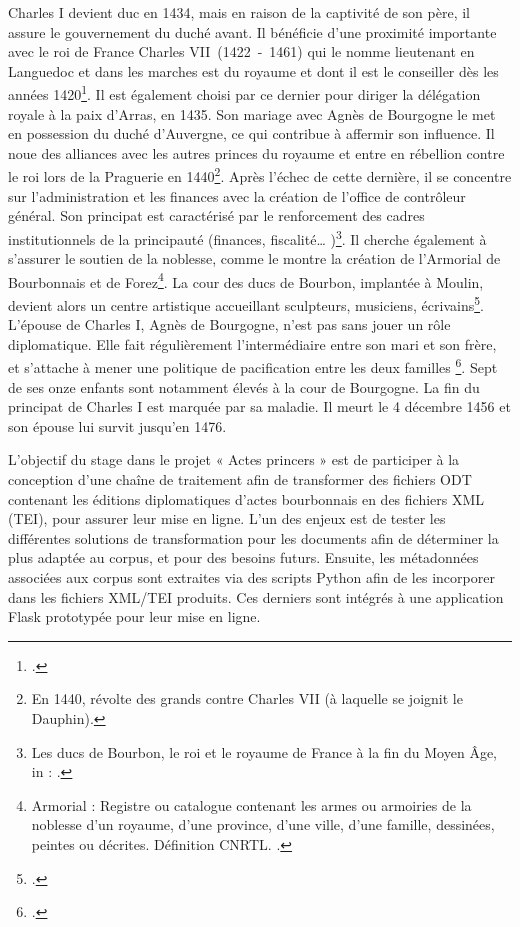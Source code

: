 \par Charles I devient duc en 1434, mais en raison de la captivité de son père, il assure le gouvernement du duché avant. Il bénéficie d'une proximité importante avec le roi de France Charles VII~(1422~-~1461) qui le nomme lieutenant en Languedoc et dans les marches est du royaume et dont il est le conseiller dès les années 1420\footnote{\cite{leguaiSeigneurieEtatBourbonnais1975a}.}. Il est également choisi par ce dernier pour diriger la délégation royale à la paix d’Arras, en 1435. Son mariage avec Agnès de Bourgogne le met en possession du duché d'Auvergne, ce qui contribue à affermir son influence. Il noue des alliances avec les autres princes du royaume et entre en rébellion contre le roi lors de la Praguerie en 1440\footnote{En 1440, révolte des grands contre Charles VII (à laquelle se joignit le Dauphin).}. Après l'échec de cette dernière, il se concentre sur l'administration et les finances avec la création de l'office de contrôleur général. Son principat est caractérisé par le renforcement des cadres institutionnels de la principauté (finances, fiscalité… )\footnote{\og Les ducs de Bourbon, le roi et le royaume de France à la fin du Moyen Âge\fg, in : \cite{matteoniBourbonsLeurBibliotheque2022}.}. Il cherche également à s'assurer le soutien de la noblesse, comme le montre la création de l'Armorial de Bourbonnais et de Forez\footnote{Armorial : Registre ou catalogue contenant les armes ou armoiries de la noblesse d'un royaume, d'une province, d'une ville, d'une famille, dessinées, peintes ou décrites. Définition CNRTL. \cite{deboosArmorialAuvergne1998}.}. La cour des ducs de Bourbon, implantée à Moulin, devient alors un centre artistique accueillant sculpteurs, musiciens, écrivains\footnote{\cite{leguaiSeigneurieEtatBourbonnais1975a}.}. L'épouse de Charles I, Agnès de Bourgogne, n'est pas sans jouer un rôle diplomatique. Elle fait régulièrement l'intermédiaire entre son mari et son frère, et s'attache à mener une politique de pacification entre les deux familles \footnote{\cite{leguaiAgnesBourgogneDuchesse1996}.}. Sept de ses onze enfants sont notamment élevés à la cour de Bourgogne. La fin du principat de Charles I est marquée par sa maladie. Il meurt le 4 décembre 1456 et son épouse lui survit jusqu'en 1476.
\newpage 

\par L'objectif du stage dans le projet « Actes princers » est de participer à la conception d'une chaîne de traitement afin de transformer des fichiers ODT contenant les éditions diplomatiques d’actes bourbonnais en des fichiers XML (TEI), pour assurer leur mise en ligne. L'un des enjeux est de tester les différentes solutions de transformation pour les documents afin de déterminer la plus adaptée au corpus, et pour des besoins futurs. Ensuite, les métadonnées associées aux corpus sont extraites via des scripts Python afin de les incorporer dans les fichiers XML/TEI produits. Ces derniers sont intégrés à une application Flask prototypée pour leur mise en ligne. 
\newline 

